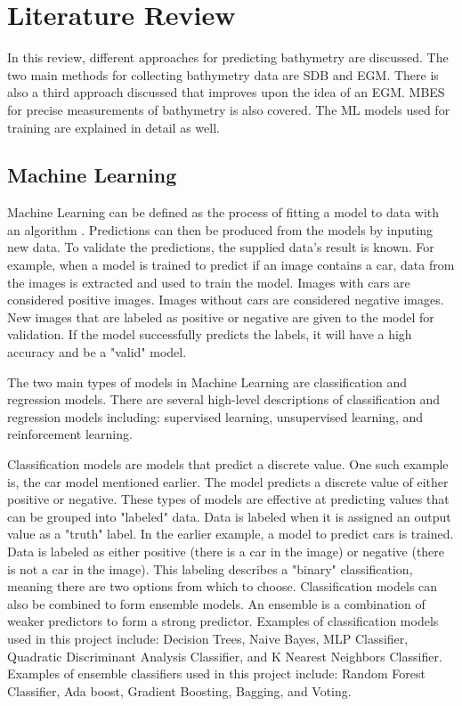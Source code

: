 \section{Literature Review}
\setlength{\parindent}{10ex}
In this review, different approaches for predicting bathymetry are discussed.
The two main methods for collecting bathymetry data are \ac{SDB} and \ac{EGM}.
There is also a third approach discussed that improves upon the idea of an \ac{EGM}.
\ac{MBES} for precise measurements of bathymetry \cite{farr1980multibeam} is also covered.
The \ac{ML} models used for training are explained in detail as well.

\subsection{Machine Learning}
Machine Learning can be defined as the process of fitting a model to data with an algorithm \cite{bishop2006pattern}.
Predictions can then be produced from the models by inputing new data.
To validate the predictions, the supplied data's result is known.
For example, when a model is trained to predict if an image contains a car, data from the images is extracted and used to train the model.
Images with cars are considered positive images.
Images without cars are considered negative images.
New images that are labeled as positive or negative are given to the model for validation.
If the model successfully predicts the labels, it will have a high accuracy and be a "valid" model.

\par
The two main types of models in Machine Learning are classification and regression models.
There are several high-level descriptions of classification and regression models including: supervised learning, unsupervised learning, and reinforcement learning.

\par
Classification models are models that predict a discrete value.
One such example is, the car model mentioned earlier.
The model predicts a discrete value of either positive or negative.
These types of models are effective at predicting values that can be grouped into "labeled" data.
Data is labeled when it is assigned an output value as a "truth" label.
In the earlier example, a model to predict cars is trained.
Data is labeled as either positive (there is a car in the image) or negative (there is not a car in the image).
This labeling describes a "binary" classification, meaning there are two options from which to choose.
Classification models can also be combined to form ensemble models.
An ensemble is a combination of weaker predictors to form a strong predictor.
Examples of classification models used in this project include: Decision Trees, Naive Bayes, MLP Classifier, Quadratic Discriminant Analysis Classifier, and K Nearest Neighbors Classifier.
Examples of ensemble classifiers used in this project include: Random Forest Classifier, Ada boost, Gradient Boosting, Bagging, and Voting.

